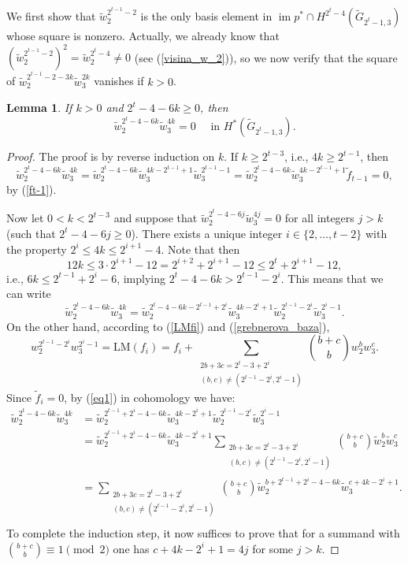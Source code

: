 \documentclass{amsart}
\newcommand{\im}{\operatorname{im}}
\newtheorem{lemma}[theorem]{Lemma}
\theoremstyle{definition}
\theoremstyle{remark}
\numberwithin{equation}{section}
\begin{document}
We first show that $\widetilde w_2^{2^{t-1}-2}$ is the only basis element in $\im p^*\cap H^{2^t-4}(\widetilde G_{2^t-1,3})$ whose square is nonzero. Actually, we already know that $(\widetilde w_2^{2^{t-1}-2})^2=\widetilde w_2^{2^t-4}\neq0$ (see (\ref{visina_w_2})), so we now verify that the square of $\widetilde w_2^{2^{t-1}-2-3k}\widetilde w_3^{2k}$ vanishes if $k>0$.

\begin{lemma}\label{kvadrati_su_nula}
If $k>0$ and $2^t-4-6k\ge0$, then
\[\widetilde w_2^{2^t-4-6k}\widetilde w_3^{4k}=0 \quad \mbox{ in } H^*(\widetilde G_{2^t-1,3}).\]
\end{lemma}
\begin{proof}
The proof is by reverse induction on $k$. If $k\ge2^{t-3}$, i.e., $4k\ge2^{t-1}$, then
\[\widetilde w_2^{2^t-4-6k}\widetilde w_3^{4k}=\widetilde w_2^{2^t-4-6k}\widetilde w_3^{4k-2^{t-1}+1}\widetilde w_3^{2^{t-1}-1}=\widetilde w_2^{2^t-4-6k}\widetilde w_3^{4k-2^{t-1}+1}\widetilde f_{t-1}=0,\]
by (\ref{ft-1}).

Now let $0<k<2^{t-3}$ and suppose that $\widetilde w_2^{2^t-4-6j}\widetilde w_3^{4j}=0$ for all integers $j>k$ (such that $2^t-4-6j\ge0$). There exists a unique integer $i\in\{2,\ldots,t-2\}$ with the property $2^i\le4k\le2^{i+1}-4$. Note that then 
\[12k\le3\cdot2^{i+1}-12=2^{i+2}+2^{i+1}-12\le2^t+2^{i+1}-12,\]
i.e., $6k\le2^{t-1}+2^i-6$, implying $2^t-4-6k>2^{t-1}-2^i$. This means that we can write
\begin{equation}\label{eq1}
\widetilde w_2^{2^t-4-6k}\widetilde w_3^{4k}=\widetilde w_2^{2^t-4-6k-2^{t-1}+2^i}\widetilde w_3^{4k-2^i+1}\widetilde w_2^{2^{t-1}-2^i}\widetilde w_3^{2^i-1}.
\end{equation}
On the other hand, according to (\ref{LMfi}) and (\ref{grebnerova_baza}), 
\[w_2^{2^{t-1}-2^i}w_3^{2^i-1}=\mathrm{LM}(f_i)=f_i+\!\!\!\sum_{\substack{2b+3c=2^t-3+2^i\\(b,c)\neq(2^{t-1}-2^i,2^i-1)}}{b+c\choose b}w_2^bw_3^c.\]
Since $\widetilde f_i=0$, by (\ref{eq1}) in cohomology we have:
\begin{align*}
\widetilde w_2^{2^t-4-6k}\widetilde w_3^{4k}&=\widetilde w_2^{2^{t-1}+2^i-4-6k}\widetilde w_3^{4k-2^i+1}\widetilde w_2^{2^{t-1}-2^i}\widetilde w_3^{2^i-1}\\
                                            &=\widetilde w_2^{2^{t-1}+2^i-4-6k}\widetilde w_3^{4k-2^i+1}\!\!\!\sum_{\substack{2b+3c=2^t-3+2^i\\(b,c)\neq(2^{t-1}-2^i,2^i-1)}}{b+c\choose b}\widetilde w_2^b\widetilde w_3^c\\
                                            &=\!\!\!\sum_{\substack{2b+3c=2^t-3+2^i\\(b,c)\neq(2^{t-1}-2^i,2^i-1)}}{b+c\choose b}\widetilde w_2^{b+2^{t-1}+2^i-4-6k}\widetilde w_3^{c+4k-2^i+1}.\\
\end{align*}
To complete the induction step, it now suffices to prove that for a summand with ${b+c\choose b}\equiv1\pmod2$ one has $c+4k-2^i+1=4j$ for some $j>k$.


\end{proof}
\end{document}
